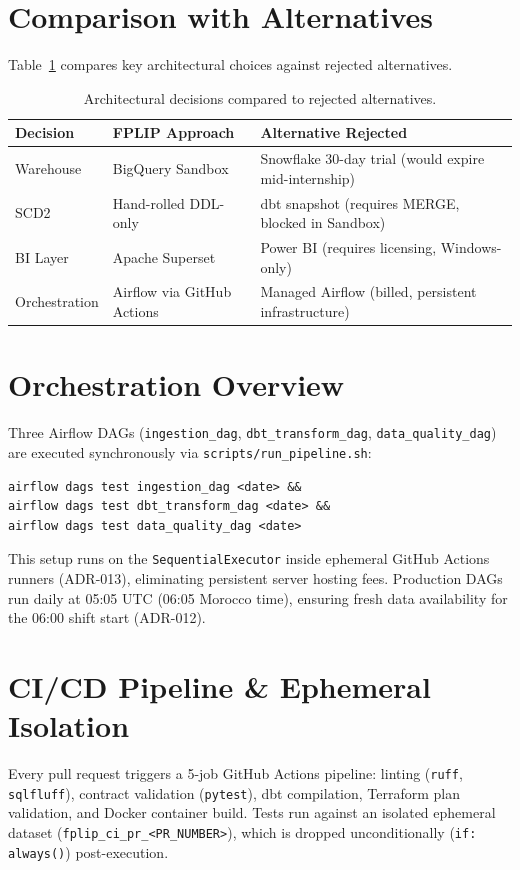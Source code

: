\documentclass[12pt, a4paper]{report}
\begin{document}
\section{Comparison with Alternatives}
Table~\ref{tab:alternatives} compares key architectural choices against rejected alternatives.

\begin{table}[h]
\centering
\begin{tabularx}{\textwidth}{p{2.5cm} p{3.5cm} X}
\toprule
\textbf{\color{primary}Decision} & \textbf{\color{primary}FPLIP Approach} & \textbf{\color{primary}Alternative Rejected} \\
\midrule
Warehouse & BigQuery Sandbox & Snowflake 30-day trial (would expire mid-internship) \\
SCD2 & Hand-rolled DDL-only & dbt snapshot (requires MERGE, blocked in Sandbox) \\
BI Layer & Apache Superset & Power BI (requires licensing, Windows-only) \\
Orchestration & Airflow via GitHub Actions & Managed Airflow (billed, persistent infrastructure) \\
\bottomrule
\end{tabularx}
\caption{Architectural decisions compared to rejected alternatives.}
\label{tab:alternatives}
\end{table}

\section{Orchestration Overview}
\label{sec:orchestration}
Three Airflow DAGs (\texttt{ingestion\_dag}, \texttt{dbt\_transform\_dag}, \texttt{data\_quality\_dag}) are executed synchronously via \texttt{scripts/run\_pipeline.sh}:
\begin{lstlisting}[style=bashstyle, caption={Synchronous DAG execution script}, label={lst:dag-chain}]
airflow dags test ingestion_dag <date> &&
airflow dags test dbt_transform_dag <date> &&
airflow dags test data_quality_dag <date>
\end{lstlisting}
This setup runs on the \texttt{SequentialExecutor} inside ephemeral GitHub Actions runners (ADR-013), eliminating persistent server hosting fees. Production DAGs run daily at 05:05 UTC (06:05 Morocco time), ensuring fresh data availability for the 06:00 shift start (ADR-012).

\section{CI/CD Pipeline \& Ephemeral Isolation}
Every pull request triggers a 5-job GitHub Actions pipeline: linting (\texttt{ruff}, \texttt{sqlfluff}), contract validation (\texttt{pytest}), dbt compilation, Terraform plan validation, and Docker container build. Tests run against an isolated ephemeral dataset (\texttt{fplip\_ci\_pr\_<PR\_NUMBER>}), which is dropped unconditionally (\texttt{if: always()}) post-execution.
\end{document}
